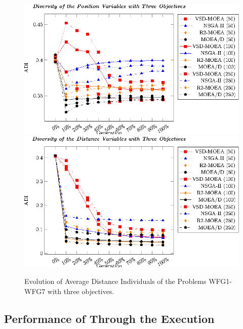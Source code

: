 \begin{figure}[t]
\centering
%
\includegraphics[]{Images/Graphic-Diversity_3obj_tikz-figure0.eps} \\
\includegraphics[]{Images/Graphic-Diversity_3obj_tikz-figure1.eps}
\caption{Evolution of Average Distance Individuals of the Problems WFG1-WFG7 with three objectives.}\label{fig:Diversity_3obj}
\end{figure}
%

\subsection{Performance of \MOEAS{} Through the Execution}


